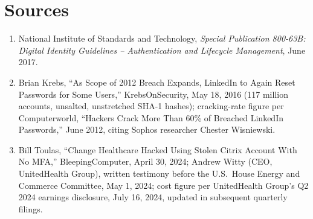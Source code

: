 \section*{Sources}
\begin{enumerate}[label=\lbrack\arabic*\rbrack, leftmargin=2.2em]
\item {}National Institute of Standards and Technology, \emph{Special Publication
800-63B: Digital Identity Guidelines -- Authentication and Lifecycle Management}, June 2017.
\item {}Brian Krebs, ``As Scope of 2012 Breach Expands, LinkedIn to Again Reset
Passwords for Some Users,'' KrebsOnSecurity, May 18, 2016 (117 million accounts, unsalted,
unstretched SHA-1 hashes); cracking-rate figure per Computerworld, ``Hackers Crack More Than 60\%
of Breached LinkedIn Passwords,'' June 2012, citing Sophos researcher Chester Wisniewski.
\item {}Bill Toulas, ``Change Healthcare Hacked Using Stolen Citrix Account With No
MFA,'' BleepingComputer, April 30, 2024; Andrew Witty (CEO, UnitedHealth Group), written testimony
before the U.S.\ House Energy and Commerce Committee, May 1, 2024; cost figure per UnitedHealth
Group's Q2 2024 earnings disclosure, July 16, 2024, updated in subsequent quarterly filings.
\end{enumerate}
